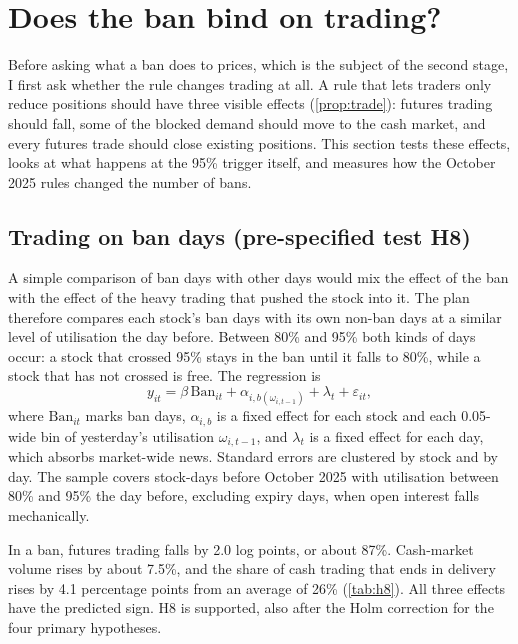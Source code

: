\section{Does the ban bind on trading?}\label{sec:ban}

Before asking what a ban does to prices, which is the subject of the second stage, I first ask whether the rule
changes trading at all. A rule that lets traders only reduce positions should have three visible effects
(\cref{prop:trade}): futures trading should fall, some of the blocked demand should move to the cash market, and every
futures trade should close existing positions. This section tests these effects, looks at what happens at the 95\%
trigger itself, and measures how the October 2025 rules changed the number of bans.

\subsection{Trading on ban days (pre-specified test H8)}
A simple comparison of ban days with other days would mix the effect of the ban with the effect of the heavy trading
that pushed the stock into it. The plan therefore compares each stock's ban days with its own non-ban days at a similar
level of utilisation the day before. Between 80\% and 95\% both kinds of days occur: a stock that crossed 95\% stays in
the ban until it falls to 80\%, while a stock that has not crossed is free. The regression is
\begin{equation}\label{eq:h8}
y_{it}=\beta\,\mathrm{Ban}_{it}+\alpha_{i,b(\omega_{i,t-1})}+\lambda_t+\varepsilon_{it},
\end{equation}
where $\mathrm{Ban}_{it}$ marks ban days, $\alpha_{i,b}$ is a fixed effect for each stock and each 0.05-wide bin of
yesterday's utilisation $\omega_{i,t-1}$, and $\lambda_t$ is a fixed effect for each day, which absorbs market-wide
news. Standard errors are clustered by stock and by day. The sample covers stock-days before October 2025 with
utilisation between 80\% and 95\% the day before, excluding expiry days, when open interest falls mechanically.

In a ban, futures trading falls by 2.0 log points, or about 87\%. Cash-market volume rises by about 7.5\%, and the share of
cash trading that ends in delivery rises by 4.1 percentage points from an average of 26\% (\cref{tab:h8}). All three
effects have the predicted sign. H8 is supported, also after the Holm correction for the four primary hypotheses.

